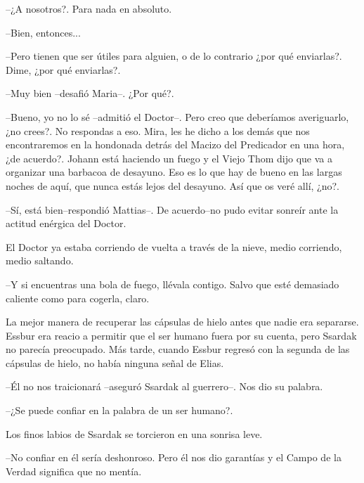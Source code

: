 --¿A nosotros?. Para nada en absoluto.



--Bien, entonces...



--Pero tienen que ser útiles para alguien, o de lo contrario ¿por qué enviarlas?. Dime, ¿por qué enviarlas?.



--Muy bien --desafió Maria--. ¿Por qué?.



--Bueno, yo no lo sé --admitió el Doctor--. Pero creo que deberíamos averiguarlo, ¿no crees?. No respondas a eso. Mira, les he dicho a los demás que nos encontraremos en la hondonada detrás del Macizo del Predicador en una hora, ¿de acuerdo?. Johann está haciendo un fuego y el Viejo Thom dijo que va a organizar una barbacoa de desayuno. Eso es lo que hay de bueno en las largas noches de aquí, que nunca estás lejos del desayuno. Así que os veré allí, ¿no?.



--Sí, está bien--respondió Mattias--. De acuerdo--no pudo evitar sonreír ante la actitud enérgica del Doctor.



El Doctor ya estaba corriendo de vuelta a través de la nieve, medio corriendo, medio saltando. 


--Y si encuentras una bola de fuego, llévala contigo. Salvo que esté demasiado caliente como para cogerla, claro.



\mbox{}



La mejor manera de recuperar las cápsulas de hielo antes que nadie era separarse. Essbur era reacio a permitir que el ser humano fuera por su cuenta, pero Ssardak no parecía preocupado. Más tarde, cuando Essbur regresó con la segunda de las cápsulas de hielo, no había ninguna señal de Elias.



--Él no nos traicionará --aseguró Ssardak al guerrero--. Nos dio su palabra.



--¿Se puede confiar en la palabra de un ser humano?.



Los finos labios de Ssardak se torcieron en una sonrisa leve. 


--No confiar en él sería deshonroso. Pero él nos dio garantías y el Campo de la Verdad significa que no mentía.



